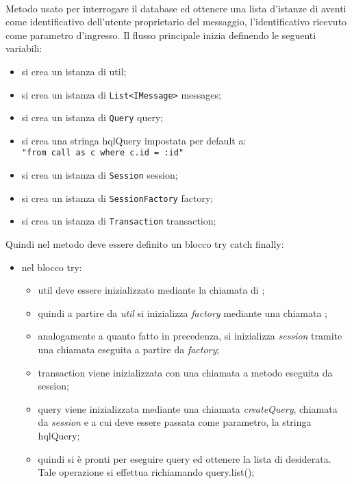 \begin{description}
	\item{}\\
	Metodo usato per interrogare il database ed ottenere una lista d'istanze di  aventi come identificativo dell'utente proprietario del messaggio, l'identificativo ricevuto come parametro d'ingresso. Il flusso principale inizia definendo le seguenti variabili:
	\begin{itemize}
		\item si crea un istanza di  util;
		\item si crea un istanza di \texttt{List<IMessage>} messages;
		\item si crea un istanza di \texttt{Query} query;
		\item si crea una stringa hqlQuery impostata per default a:\\
			\verb|"from call as c where c.id = :id"|
		\item si crea un istanza di \texttt{Session} session;
		\item si crea un istanza di \texttt{SessionFactory} factory;
		\item si crea un istanza di \texttt{Transaction} transaction;
	\end{itemize}
	Quindi nel metodo deve essere definito un blocco try catch finally:
	\begin{itemize}
		\item nel blocco try:
		\begin{itemize}
			\item util deve essere inizializzato mediante la chiamata  di ;
			\item quindi a partire da \textit{util} si inizializza \textit{factory} mediante una chiamata ;
			\item analogamente a quanto fatto in precedenza, si inizializza \textit{session} tramite una chiamata  eseguita a partire da \textit{factory};
			\item transaction viene inizializzata con una chiamata a metodo  eseguita da session;
			\item query viene inizializzata mediante una chiamata \textit{createQuery}, chiamata da \textit{session} e a cui deve essere passata come parametro, la stringa hqlQuery;
			\item quindi si è pronti per eseguire query ed ottenere la lista di  desiderata. Tale operazione si effettua richiamando query.list();

\end{itemize}
\end{itemize}
\end{description}
